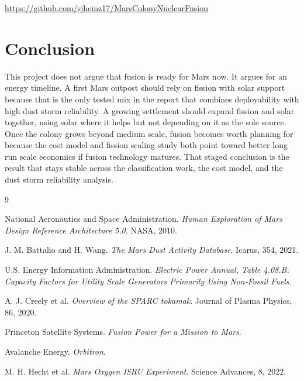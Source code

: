\documentclass[11pt]{article}
\begin{document}
\begin{center}
\href{https://github.com/sjheinz17/MarsColonyNuclearFusion}{https://github.com/sjheinz17/MarsColonyNuclearFusion}
\end{center}

\section{Conclusion}

This project does not argue that fusion is ready for Mars now. It argues for an energy timeline. A first Mars outpost should rely on fission with solar support because that is the only tested mix in the report that combines deployability with high dust storm reliability. A growing settlement should expand fission and solar together, using solar where it helps but not depending on it as the sole source. Once the colony grows beyond medium scale, fusion becomes worth planning for because the cost model and fission scaling study both point toward better long run scale economics if fusion technology matures. That staged conclusion is the result that stays stable across the classification work, the cost model, and the dust storm reliability analysis.

\begin{thebibliography}{9}

National Aeronautics and Space Administration.
\newblock \emph{Human Exploration of Mars Design Reference Architecture 5.0}.
\newblock NASA, 2010.

J. M. Battalio and H. Wang.
\newblock \emph{The Mars Dust Activity Database}.
\newblock Icarus, 354, 2021.

U.S. Energy Information Administration.
\newblock \emph{Electric Power Annual, Table 4.08.B. Capacity Factors for Utility Scale Generators Primarily Using Non-Fossil Fuels}.

A. J. Creely et al.
\newblock \emph{Overview of the SPARC tokamak}.
\newblock Journal of Plasma Physics, 86, 2020.

Princeton Satellite Systems.
\newblock \emph{Fusion Power for a Mission to Mars}.

Avalanche Energy.
\newblock \emph{Orbitron}.

M. H. Hecht et al.
\newblock \emph{Mars Oxygen ISRU Experiment}.
\newblock Science Advances, 8, 2022.

\end{thebibliography}
\end{document}
